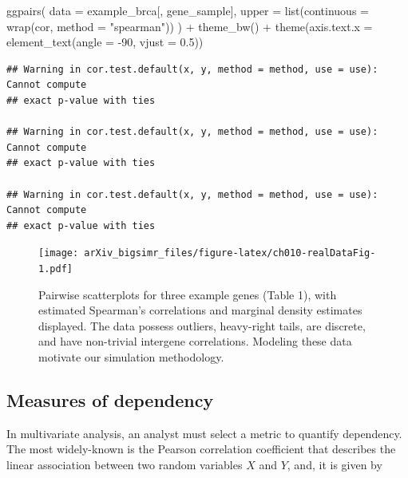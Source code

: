 \documentclass{article}
\newenvironment{Shaded}{\begin{snugshade}}{\end{snugshade}}
\newcommand{\AttributeTok}[1]{\textcolor[rgb]{0.77,0.63,0.00}{#1}}
\newcommand{\DecValTok}[1]{\textcolor[rgb]{0.00,0.00,0.81}{#1}}
\newcommand{\FloatTok}[1]{\textcolor[rgb]{0.00,0.00,0.81}{#1}}
\newcommand{\FunctionTok}[1]{\textcolor[rgb]{0.00,0.00,0.00}{#1}}
\newcommand{\NormalTok}[1]{#1}
\newcommand{\SpecialCharTok}[1]{\textcolor[rgb]{0.00,0.00,0.00}{#1}}
\newcommand{\StringTok}[1]{\textcolor[rgb]{0.31,0.60,0.02}{#1}}
\begin{document}
\begin{Shaded}
\begin{Highlighting}[]
\FunctionTok{ggpairs}\NormalTok{(}
  \AttributeTok{data =}\NormalTok{ example\_brca[, gene\_sample],}
  \AttributeTok{upper =} \FunctionTok{list}\NormalTok{(}\AttributeTok{continuous =} \FunctionTok{wrap}\NormalTok{(}\StringTok{\textquotesingle{}cor\textquotesingle{}}\NormalTok{, }\AttributeTok{method =} \StringTok{"spearman"}\NormalTok{))}
\NormalTok{) }\SpecialCharTok{+} 
  \FunctionTok{theme\_bw}\NormalTok{() }\SpecialCharTok{+}
  \FunctionTok{theme}\NormalTok{(}\AttributeTok{axis.text.x =} \FunctionTok{element\_text}\NormalTok{(}\AttributeTok{angle =} \SpecialCharTok{{-}}\DecValTok{90}\NormalTok{, }\AttributeTok{vjust =} \FloatTok{0.5}\NormalTok{))}
\end{Highlighting}
\end{Shaded}

\begin{verbatim}
## Warning in cor.test.default(x, y, method = method, use = use): Cannot compute
## exact p-value with ties

## Warning in cor.test.default(x, y, method = method, use = use): Cannot compute
## exact p-value with ties

## Warning in cor.test.default(x, y, method = method, use = use): Cannot compute
## exact p-value with ties
\end{verbatim}

\begin{figure}
\centering
\texttt{[image: arXiv\_bigsimr\_files/figure-latex/ch010-realDataFig-1.pdf]}
\caption{Pairwise scatterplots for three example genes (Table 1), with
estimated Spearman's correlations and marginal density estimates
displayed. The data possess outliers, heavy-right tails, are discrete,
and have non-trivial intergene correlations. Modeling these data
motivate our simulation methodology.}
\end{figure}

\hypertarget{measures-of-dependency}{%
\subsection{Measures of dependency}\label{measures-of-dependency}}

In multivariate analysis, an analyst must select a metric to quantify
dependency. The most widely-known is the Pearson correlation coefficient
that describes the linear association between two random variables \(X\)
and \(Y\), and, it is given by
\end{document}
